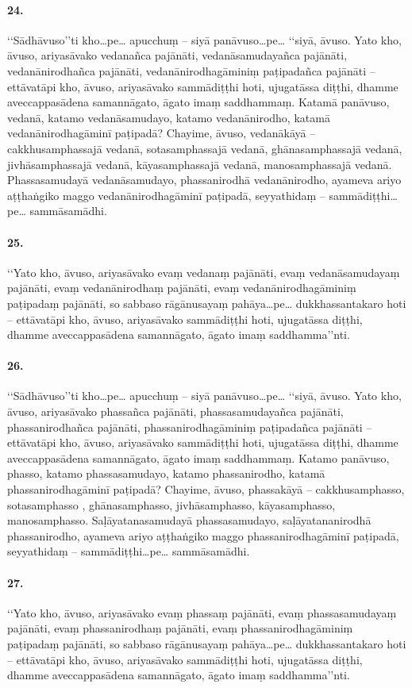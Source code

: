 \paragraph{24.} ‘‘Sādhāvuso’’ti kho…pe… apucchuṃ – siyā panāvuso…pe… ‘‘siyā, āvuso. Yato kho, āvuso, ariyasāvako vedanañca pajānāti, vedanāsamudayañca pajānāti, vedanānirodhañca pajānāti, vedanānirodhagāminiṃ paṭipadañca pajānāti – ettāvatāpi kho, āvuso, ariyasāvako sammādiṭṭhi hoti, ujugatāssa diṭṭhi, dhamme aveccappasādena samannāgato, āgato imaṃ saddhammaṃ. Katamā panāvuso, vedanā, katamo vedanāsamudayo, katamo vedanānirodho, katamā vedanānirodhagāminī paṭipadā? Chayime, āvuso, vedanākāyā – cakkhusamphassajā vedanā, sotasamphassajā vedanā, ghānasamphassajā vedanā, jivhāsamphassajā vedanā, kāyasamphassajā vedanā, manosamphassajā vedanā. Phassasamudayā vedanāsamudayo, phassanirodhā vedanānirodho, ayameva ariyo aṭṭhaṅgiko maggo vedanānirodhagāminī paṭipadā, seyyathidaṃ – sammādiṭṭhi…pe… sammāsamādhi.

\paragraph{25.} ‘‘Yato kho, āvuso, ariyasāvako evaṃ vedanaṃ pajānāti, evaṃ vedanāsamudayaṃ pajānāti, evaṃ vedanānirodhaṃ pajānāti, evaṃ vedanānirodhagāminiṃ paṭipadaṃ pajānāti, so sabbaso rāgānusayaṃ pahāya…pe… dukkhassantakaro hoti – ettāvatāpi kho, āvuso, ariyasāvako sammādiṭṭhi hoti, ujugatāssa diṭṭhi, dhamme aveccappasādena samannāgato, āgato imaṃ saddhamma’’nti.

\paragraph{26.} ‘‘Sādhāvuso’’ti kho…pe… apucchuṃ – siyā panāvuso…pe… ‘‘siyā, āvuso. Yato kho, āvuso, ariyasāvako phassañca pajānāti, phassasamudayañca pajānāti, phassanirodhañca pajānāti, phassanirodhagāminiṃ paṭipadañca pajānāti – ettāvatāpi kho, āvuso, ariyasāvako sammādiṭṭhi hoti, ujugatāssa diṭṭhi, dhamme aveccappasādena samannāgato, āgato imaṃ saddhammaṃ. Katamo panāvuso, phasso, katamo phassasamudayo, katamo phassanirodho, katamā phassanirodhagāminī paṭipadā? Chayime, āvuso, phassakāyā – cakkhusamphasso, sotasamphasso , ghānasamphasso, jivhāsamphasso, kāyasamphasso, manosamphasso. Saḷāyatanasamudayā phassasamudayo, saḷāyatananirodhā phassanirodho, ayameva ariyo aṭṭhaṅgiko maggo phassanirodhagāminī paṭipadā, seyyathidaṃ – sammādiṭṭhi…pe… sammāsamādhi.

\paragraph{27.} ‘‘Yato kho, āvuso, ariyasāvako evaṃ phassaṃ pajānāti, evaṃ phassasamudayaṃ pajānāti, evaṃ phassanirodhaṃ pajānāti, evaṃ phassanirodhagāminiṃ paṭipadaṃ pajānāti, so sabbaso rāgānusayaṃ pahāya…pe… dukkhassantakaro hoti – ettāvatāpi kho, āvuso, ariyasāvako sammādiṭṭhi hoti, ujugatāssa diṭṭhi, dhamme aveccappasādena samannāgato, āgato imaṃ saddhamma’’nti.

